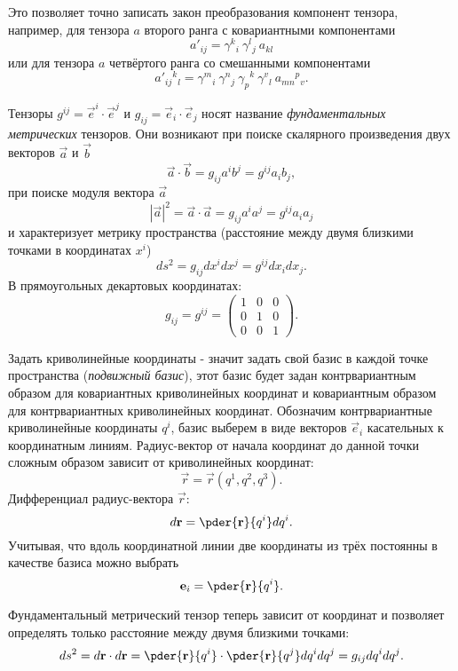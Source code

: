 Это позволяет точно записать закон преобразования компонент тензора, например,
для тензора \( a \) второго ранга с ковариантными компонентами
\[
    a'_{ij} = \gamma^k{}_i\ \gamma^l{}_j\ a_{kl}
\]
 или для тензора \( a \) четвёртого  ранга со смешанными компонентами
\[
    a'_{ij}{}^{k}{}_{l} = \gamma^m{}_i\ \gamma^n{}_j\ 
    \gamma_p{}^k\ \gamma^v{}_l\ a_{mn}{}^{p}{}_{v}.
\]  

Тензоры \( g^{ij} = \vec{e}^{i} \cdot \vec{e}^{j} \) и
\( g_{ij} = \vec{e}_{i} \cdot \vec{e}_{j} \) носят название
\emph{фундаментальных метрических} тензоров. Они возникают при поиске
скалярного произведения двух векторов \( \vec{a} \) и \( \vec{b} \)
\[
    \vec{a}\cdot\vec{b} = g_{ij} a^i b^j = g^{ij} a_i b_j,
\]
при поиске модуля вектора \( \vec{a} \)
\[
    |\vec{a}|^2 = \vec{a}\cdot\vec{a} =
    g_{ij}a^ia^j = g^{ij} a_i a_j
\]
и характеризует метрику пространства (расстояние между двумя близкими точками в
координатах \( x^i \))
\[
    ds^2 = g_{ij}dx^idx^j = g^{ij} dx_i dx_j.
\]      
В прямоугольных декартовых координатах:
\[
    g_{ij} = g^{ij} =
        \left(
            \begin{array}{ccc}
            1 & 0 & 0 \\
            0 & 1 & 0 \\
            0 & 0 & 1
            \end{array}
        \right).
\]
    
Задать криволинейные координаты - значит задать свой базис в каждой точке
пространства (\emph{подвижный базис}), этот базис будет задан контрвариантным
образом для ковариантных криволинейных координат и ковариантным образом для
контрвариантных криволинейных координат. Обозначим контрвариантные
криволинейные координаты \( q^i \), базис выберем в виде векторов
\( \vec{e}_{i} \) касательных к координатным линиям. Радиус-вектор от начала
координат до данной точки сложным образом зависит от криволинейных координат:
\[
    \vec{r} = \vec{r}(q^1, q^2, q^3).
\]
Дифференциал радиус-вектора \( \vec{r} \):
\[
    d\vec{r} = \pder{\vec{r}}{q^i}dq^i.
\]
Учитывая, что вдоль координатной линии две координаты из трёх постоянны в
качестве базиса можно выбрать
\[
    \vec{e}_{i} =  \pder{\vec{r}}{q^i}.
\]
    
Фундаментальный метрический тензор теперь зависит от координат и позволяет
определять только расстояние между двумя близкими точками:
\[
    ds^2 = d\vec{r}\cdot d\vec{r} = 
    \pder{ \vec{r}}{q^i}\cdot \pder{ \vec{r}}{q^j} dq^i dq^j =
    g_{ij} dq^i dq^j.
\]

